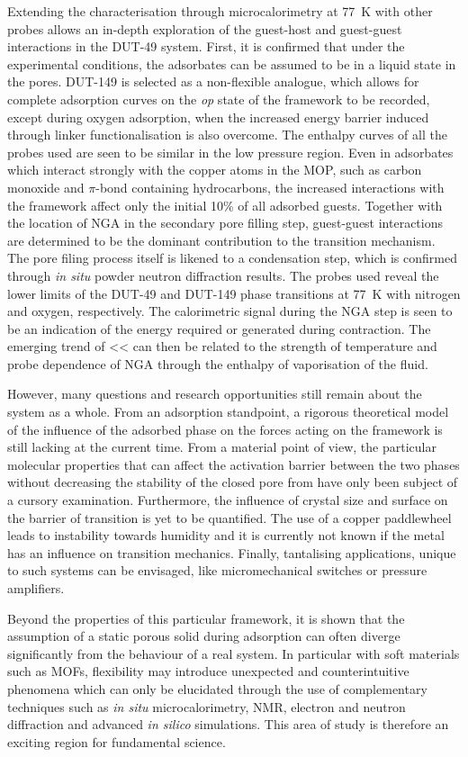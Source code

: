Extending the characterisation through microcalorimetry at \SI{77}{\kelvin}
with other probes allows an in-depth exploration of the guest-host and 
guest-guest interactions in the DUT-49 system. First, it is confirmed 
that under the experimental conditions, the adsorbates can be assumed to 
be in a liquid state in the pores. DUT-149 is selected as a non-flexible 
analogue, which allows for complete adsorption curves on the \textit{op}
state of the framework to be recorded, except during oxygen adsorption,
when the increased energy barrier induced through linker functionalisation
is also overcome. The enthalpy curves of all the probes used are seen to 
be similar in the low pressure region. Even in adsorbates which interact 
strongly with the copper atoms in the \gls{MOP}, such as carbon 
monoxide and \(\pi\)-bond containing hydrocarbons, the 
increased interactions with the 
framework affect only the initial 10\% of all adsorbed guests. Together
with the location of \gls{NGA} in the secondary pore filling step,
guest-guest interactions are determined to be the dominant contribution 
to the transition mechanism. The pore filing process itself is likened
to a condensation step, which is confirmed through \textit{in situ}
powder neutron diffraction results.
The probes used reveal the lower limits of the DUT-49
and DUT-149 phase transitions at \SI{77}{\kelvin} with nitrogen and 
oxygen, respectively. The calorimetric signal during the \gls{NGA} step
is seen to be an indication of the energy required or generated 
during contraction. The emerging trend of <<
can then be related to the strength of temperature and probe dependence
of \gls{NGA} through the enthalpy of vaporisation of the fluid.

However, many questions and research opportunities still remain about the 
system as a whole. From an adsorption standpoint, a rigorous theoretical 
model of the influence of the adsorbed phase on the forces acting on the
framework is still lacking at the current time.
From a material point of view, the particular molecular properties that 
can affect the activation barrier between the two phases without 
decreasing the stability of the closed pore from have only been 
subject of a cursory examination.
Furthermore, the influence of crystal size and surface on the
barrier of transition is yet to be quantified. The use of a copper 
paddlewheel leads to instability towards humidity and it is currently
not known if the metal has an influence on transition mechanics.
Finally, tantalising applications, unique to such systems can be 
envisaged, like micromechanical switches or pressure amplifiers.

Beyond the properties of this particular framework, it is shown that 
the assumption of a static porous solid during adsorption can often
diverge significantly from the behaviour of a real system. In particular
with soft materials such as \glspl{MOF}, flexibility may introduce 
unexpected and counterintuitive phenomena which can only be elucidated 
through the use of complementary techniques such as 
\textit{in situ} microcalorimetry, \gls{NMR}, electron and neutron diffraction 
and advanced \textit{in silico} simulations. This area of study is therefore
an exciting region for fundamental science.

\FloatBarrier%
\pagebreak